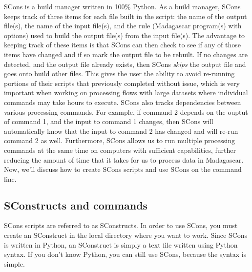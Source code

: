 SCons is a build manager written in 100\% Python.  As a build manager, SCons keeps track of three items for each file built in the script: the name of the output file(s), the name of the input file(s), and the rule (Madagascar program(s) with options) used to build the output file(s) from the input file(s).  The advantage to keeping track of these items is that SCons can then check to see if any of those items have changed and if so mark the output file to be rebuilt.  If no changes are detected, and the output file already exists, then SCons \emph{skips} the output file and goes onto build other files.  This gives the user the ability to avoid re-running portions of their scripts that previously completed without issue, which is very important when working on processing flows with large datasets where individual commands may take hours to execute.  SCons also tracks dependencies between various processing commands.  For example, if command 2 depends on the ouptut of command 1, and the input to command 1 changes, then SCons will automatically know that the input to command 2 has changed and will re-run command 2 as well.   Furthermore, SCons allows us to run multiple processing commands at the same time on computers with sufficient capabilities, further reducing the amount of time that it takes for us to process data in Madagascar.  Now, we'll discuss how to create SCons scripts and use SCons on the command line.

\subsection{SConstructs and commands}

SCons scripts are referred to as SConstructs.  In order to use SCons, you must create an SConstruct in the local directory where you want to work. Since SCons is written in Python, an SConstruct is simply a text file written using Python syntax.  If you don't know Python, you can still use SCons, because the syntax is simple.

